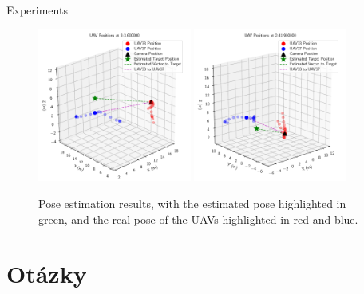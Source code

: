 \documentclass{beamer}
\begin{document}
\begin{frame}{Experiments}

\begin{figure}[H]
	\centering
	  \includegraphics[width=0.45\textwidth]{../fig/pgfplot/build/3dplot3.pdf}
	  \includegraphics[width=0.45\textwidth]{../fig/pgfplot/build/3dplot1.pdf}
	\caption{
           Pose estimation results, with the estimated pose highlighted in green, and the real pose of the UAVs highlighted in red and blue.
        }
	\label{fig:poseresults}
\end{figure}

\end{frame}


    

\section{Otázky}
\end{document}
